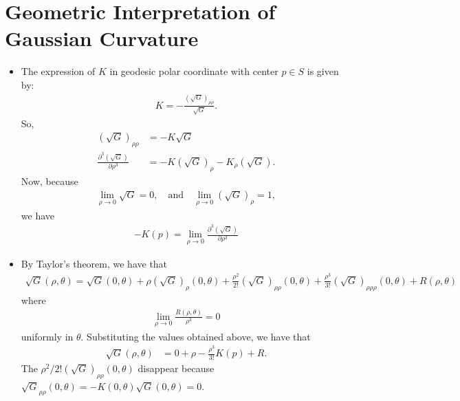 \documentclass[10pt]{article}
\newcommand{\ra}{\rightarrow}
\begin{document}
  \section{Geometric Interpretation of Gaussian Curvature}
  \begin{itemize}
    \item The expression of $K$ in geodesic polar coordinate with center $p \in S$ is given by:
    \begin{align*}
      K = -\frac{(\sqrt{G})_{\rho\rho}}{\sqrt{G}}.
    \end{align*}
    So,
    \begin{align*}
      (\sqrt{G})_{\rho\rho} &= - K \sqrt{G}\\
      \frac{\partial^3 (\sqrt{G})}{\partial \rho^3} &= - K(\sqrt{G})_\rho - K_\rho (\sqrt{G}).
    \end{align*}
    Now, because
    \begin{align*}
      \lim_{\rho \ra 0} \sqrt{G} = 0, \quad \mbox{and} \quad \lim_{\rho \ra 0} (\sqrt{G})_\rho = 1,
    \end{align*}
    we have 
    \begin{align*}
      -K(p) = \lim_{\rho \ra 0} \frac{\partial^3 (\sqrt{G})}{\partial \rho^3}
    \end{align*}

    \item By Taylor's theorem, we have that
    \begin{align*}
      \sqrt{G}(\rho, \theta) = \sqrt{G}(0,\theta) + \rho (\sqrt{G})_\rho(0,\theta) + \frac{\rho^2}{2!} (\sqrt{G})_{\rho\rho}(0,\theta) + \frac{\rho^3}{3!} (\sqrt{G})_{\rho\rho\rho}(0,\theta) + R(\rho,\theta)
    \end{align*}
    where
    \begin{align*}
      \lim_{\rho \ra 0} \frac{R(\rho,\theta)}{\rho^3} = 0
    \end{align*}
    uniformly in $\theta$. Substituting the values obtained above, we have that
    \begin{align*}
      \sqrt{G}(\rho, \theta) &= 0 + \rho - \frac{\rho^3}{3!} K(p) + R.
    \end{align*}
    The $\rho^2 / 2! (\sqrt{G})_{\rho\rho}(0, \theta)$ disappear because $\sqrt{G}_{\rho\rho}(0,\theta) = -K(0,\theta) \sqrt{G}(0,\theta) = 0$.


\end{itemize}
\end{document}

